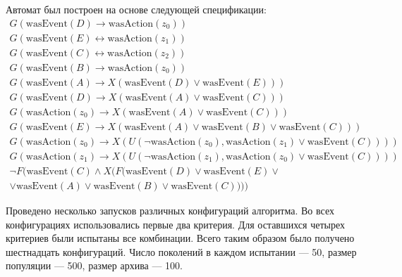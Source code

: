 \documentclass[12pt,fleqn]{article}
\begin{document}
Автомат был построен на основе следующей спецификации:
\begin{multline*}
G(\text{wasEvent}(D) \rightarrow \text{wasAction}(z_0))\\
G(\text{wasEvent}(E) \leftrightarrow \text{wasAction}(z_1))\\
G(\text{wasEvent}(C) \leftrightarrow \text{wasAction}(z_2))\\
G(\text{wasEvent}(B) \rightarrow \text{wasAction}(z_0))\\
G(\text{wasEvent}(A) \rightarrow X(\text{wasEvent}(D) \vee \text{wasEvent}(E)))\\
G(\text{wasEvent}(D) \rightarrow X(\text{wasEvent}(A) \vee \text{wasEvent}(C)))\\
G(\text{wasAction}(z_0) \rightarrow X(\text{wasEvent}(A) \vee \text{wasEvent}(C)))\\
G(\text{wasEvent}(E) \rightarrow X(\text{wasEvent}(A) \vee \text{wasEvent}(B) \vee \text{wasEvent}(C)))\\
G(\text{wasAction}(z_0) \rightarrow X(U(\lnot \text{wasAction}(z_0), \text{wasAction}(z_1) \vee \text{wasEvent}(C))))\\
G(\text{wasAction}(z_1) \rightarrow X(U(\lnot \text{wasAction}(z_1), \text{wasAction}(z_0) \vee \text{wasEvent}(C))))\\
\lnot F(\text{wasEvent}(C) \wedge X(F(\text{wasEvent}(D) \vee \text{wasEvent}(E) \vee \\ \vee \text{wasEvent}(A) \vee \text{wasEvent}(B) \vee \text{wasEvent}(C))))
\end{multline*}

Проведено несколько запусков различных конфигураций алгоритма. Во всех конфигурациях использовались первые два критерия.
Для оставшихся четырех критериев были испытаны все комбинации. Всего таким образом было получено шестнадцать конфигураций.
Число поколений в каждом испытании --- 50, размер популяции --- 500, размер архива --- 100.
\end{document}

